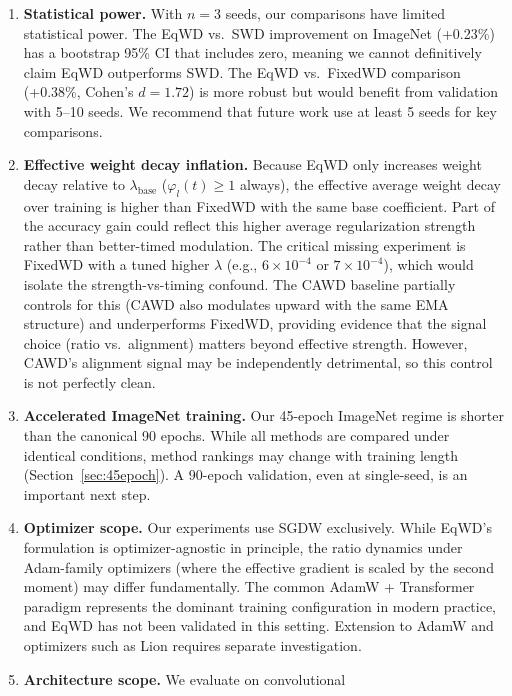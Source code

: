\documentclass{article}
\begin{document}
\begin{enumerate}
\item
  \textbf{Statistical power.} With $n = 3$ seeds, our comparisons have
  limited statistical power. The EqWD vs.~SWD improvement on ImageNet
  (+0.23\%) has a bootstrap 95\% CI that includes zero, meaning we
  cannot definitively claim EqWD outperforms SWD. The EqWD vs.~FixedWD
  comparison (+0.38\%, Cohen's $d = 1.72$) is more robust but would
  benefit from validation with 5--10 seeds. We recommend that future
  work use at least 5 seeds for key comparisons.
\item
  \textbf{Effective weight decay inflation.} Because EqWD only increases
  weight decay relative to $\lambda_{\text{base}}$
  ($\varphi_l(t) \geq 1$ always), the effective average weight decay
  over training is higher than FixedWD with the same base coefficient.
  Part of the accuracy gain could reflect this higher average
  regularization strength rather than better-timed modulation. The
  critical missing experiment is FixedWD with a tuned higher $\lambda$
  (e.g., $6 \times 10^{-4}$ or $7 \times 10^{-4}$), which would
  isolate the strength-vs-timing confound. The CAWD baseline partially
  controls for this (CAWD also modulates upward with the same EMA
  structure) and underperforms FixedWD, providing evidence that the
  signal choice (ratio vs.~alignment) matters beyond effective strength.
  However, CAWD's alignment signal may be independently detrimental, so
  this control is not perfectly clean.
\item
  \textbf{Accelerated ImageNet training.} Our 45-epoch ImageNet regime
  is shorter than the canonical 90 epochs. While all methods are
  compared under identical conditions, method rankings may change with
  training length (Section~\ref{sec:45epoch}). A 90-epoch validation, even at
  single-seed, is an important next step.
\item
  \textbf{Optimizer scope.} Our experiments use SGDW exclusively. While
  EqWD's formulation is optimizer-agnostic in principle, the ratio
  dynamics under Adam-family optimizers (where the effective gradient is
  scaled by the second moment) may differ fundamentally. The common
  AdamW + Transformer paradigm
  \citep{loshchilov2019adamw, dosovitskiy2021vit} represents the dominant
  training configuration in modern practice, and EqWD has not been
  validated in this setting. Extension to AdamW and optimizers such as
  Lion \citep{chen2023lion} requires separate investigation.
\item
  \textbf{Architecture scope.} We evaluate on convolutional

\end{enumerate}
\end{document}
